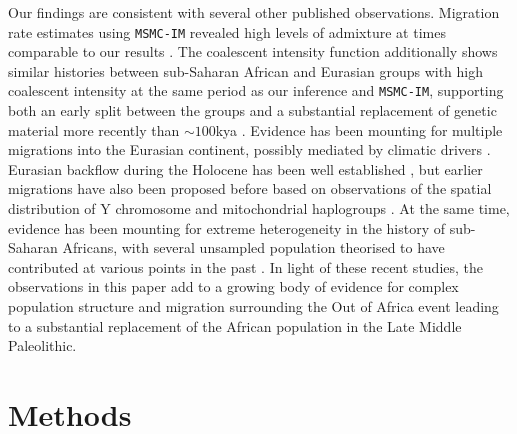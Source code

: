\documentclass{article}
\begin{document}
Our findings are consistent with several other published observations. Migration rate estimates using {\tt MSMC-IM} revealed high levels of admixture at times comparable to our results \cite{Wang2019a}. The coalescent intensity function additionally shows similar histories between sub-Saharan African and Eurasian groups with high coalescent intensity at the same period as our inference and {\tt MSMC-IM}, supporting both an early split between the groups and a substantial replacement of genetic material more recently than $\sim100$kya \cite{Albers2019}. Evidence has been mounting for multiple migrations into the Eurasian continent, possibly mediated by climatic drivers \cite{Timmermann2016, Chen2020, Pagani2016}. Eurasian backflow during the Holocene has been well established \cite{Lopez2015, GallegoLlorente2015}, but earlier migrations have also been proposed before based on observations of the spatial distribution of Y chromosome and mitochondrial haplogroups \cite{Altheide1997, Hammer1998, Cruciani2002, Chandrasekar2007, Cabrera2018, Hervella2016, Haber2019, Chen2020}. At the same time, evidence has been mounting for extreme heterogeneity in the history of sub-Saharan Africans, with several unsampled population theorised to have contributed at various points in the past \cite{Lipson2019, Durvasula2019, Speidel2019}. In light of these recent studies, the observations in this paper add to a growing body of evidence for complex population structure and migration surrounding the Out of Africa event leading to a substantial replacement of the African population in the Late Middle Paleolithic.  


\section{Methods}
\end{document}
